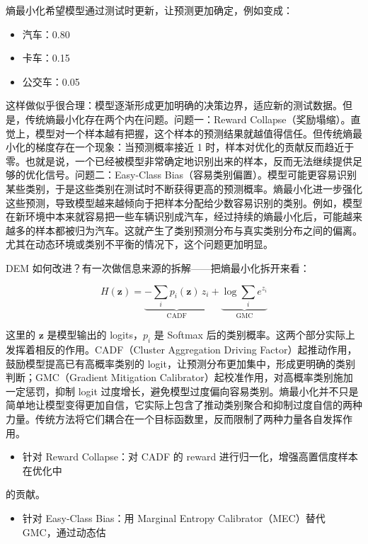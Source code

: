 熵最小化希望模型通过测试时更新，让预测更加确定，例如变成：

\begin{itemize}
  \item 汽车：0.80
  \item 卡车：0.15
  \item 公交车：0.05
\end{itemize}

这样做似乎很合理：模型逐渐形成更加明确的决策边界，适应新的测试数据。但是，传统熵最小化存在两个内在问题。问题一：Reward Collapse（奖励塌缩）。直觉上，模型对一个样本越有把握，这个样本的预测结果就越值得信任。但传统熵最小化的梯度存在一个现象：当预测概率接近 1 时，样本对优化的贡献反而趋近于零。也就是说，一个已经被模型非常确定地识别出来的样本，反而无法继续提供足够的优化信号。问题二：Easy-Class Bias（容易类别偏置）。模型可能更容易识别某些类别，于是这些类别在测试时不断获得更高的预测概率。熵最小化进一步强化这些预测，导致模型越来越倾向于把样本分配给少数容易识别的类别。例如，模型在新环境中本来就容易把一些车辆识别成汽车，经过持续的熵最小化后，可能越来越多的样本都被归为汽车。这就产生了类别预测分布与真实类别分布之间的偏离。尤其在动态环境或类别不平衡的情况下，这个问题更加明显。

DEM 如何改进？有一次做信息来源的拆解——把熵最小化拆开来看：

\[
H(\mathbf{z})=\underbrace{-\sum_i p_i(\mathbf{z})\,z_i}_{\mathrm{CADF}}+\underbrace{\log\sum_i e^{z_i}}_{\mathrm{GMC}}
\]

这里的 $\mathbf{z}$ 是模型输出的 logits，$p_i$ 是 Softmax 后的类别概率。这两个部分实际上发挥着相反的作用。CADF（Cluster Aggregation Driving Factor）起推动作用，鼓励模型提高已有高概率类别的 logit，让预测分布更加集中，形成更明确的类别判断；GMC（Gradient Mitigation Calibrator）起校准作用，对高概率类别施加一定惩罚，抑制 logit 过度增长，避免模型过度偏向容易类别。熵最小化并不只是简单地让模型变得更加自信，它实际上包含了推动类别聚合和抑制过度自信的两种力量。传统方法将它们耦合在一个目标函数里，反而限制了两种力量各自发挥作用。

\begin{itemize}
  \item 针对 Reward Collapse：对 CADF 的 reward 进行归一化，增强高置信度样本在优化中
\end{itemize}

的贡献。

\begin{itemize}
  \item 针对 Easy-Class Bias：用 Marginal Entropy Calibrator（MEC）替代 GMC，通过动态估
\end{itemize}

